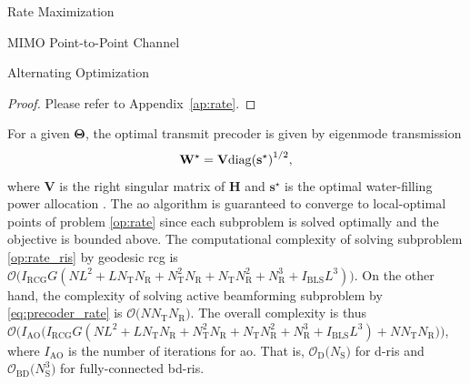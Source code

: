 \documentclass[journal]{IEEEtran}
\begin{document}
\begin{section}{Rate Maximization}
\begin{subsection}{MIMO Point-to-Point Channel}
\begin{subsubsection}{Alternating Optimization}
				\begin{proof}
					Please refer to Appendix~\ref{ap:rate}.
				\end{proof}
				For a given $\mathbf{\Theta}$, the optimal transmit precoder is given by eigenmode transmission \cite{Clerckx2013}
				\begin{equation}
					\label{eq:precoder_rate}
					\mathbf{W}^\star = \mathbf{V} {\operatorname{diag}(\mathbf{s}^\star)}^{1/2},
				\end{equation}
				where $\mathbf{V}$ is the right singular matrix of $\mathbf{H}$ and $\mathbf{s}^\star$ is the optimal water-filling power allocation \cite{Clerckx2013}.
				The \gls{ao} algorithm is guaranteed to converge to local-optimal points of problem \eqref{op:rate} since each subproblem is solved optimally and the objective is bounded above.
				The computational complexity of solving subproblem \eqref{op:rate_ris} by geodesic \gls{rcg} is $\mathcal{O}\bigl(I_\text{RCG} G (NL^2 + L N_\mathrm{T} N_\mathrm{R} + N_\mathrm{T}^2 N_\mathrm{R} + N_\mathrm{T} N_\mathrm{R}^2 + N_\mathrm{R}^3 + I_\text{BLS} L^3)\bigr)$.
				On the other hand, the complexity of solving active beamforming subproblem by \eqref{eq:precoder_rate} is $\mathcal{O}\bigl(N N_\mathrm{T} N_\mathrm{R}\bigr)$.
				The overall complexity is thus $\mathcal{O}\bigl(I_\text{AO}\bigl(I_\text{RCG} G (NL^2 + L N_\mathrm{T} N_\mathrm{R} + N_\mathrm{T}^2 N_\mathrm{R} + N_\mathrm{T} N_\mathrm{R}^2 + N_\mathrm{R}^3 + I_\text{BLS} L^3) + N N_\mathrm{T} N_\mathrm{R}\bigr)\bigr)$, where $I_\text{AO}$ is the number of iterations for \gls{ao}.
				That is, $\mathcal{O}_\mathrm{D}\bigl(N_\mathrm{S}\bigr)$ for \gls{d}-\gls{ris} and $\mathcal{O}_\mathrm{BD}\bigl(N_\mathrm{S}^3\bigr)$ for fully-connected \gls{bd}-\gls{ris}.
			\end{subsubsection}


\end{subsection}
\end{section}
\end{document}
